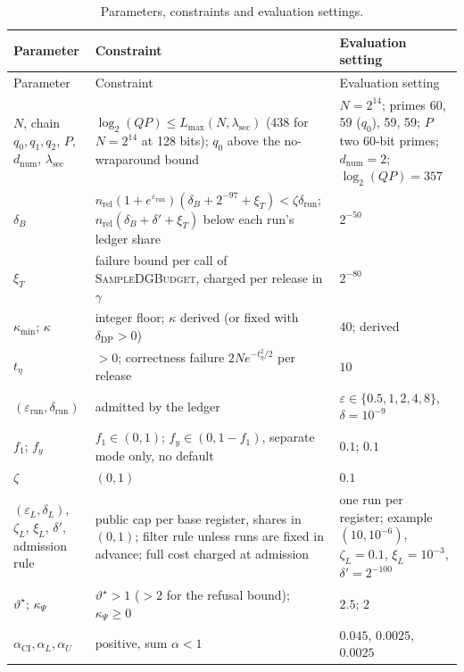 \documentclass[11pt]{article}
\theoremstyle{definition}
\theoremstyle{plain}
\begin{document}
{\small
\begin{longtable}{@{}>{\raggedright\arraybackslash}p{3.1cm}>{\raggedright\arraybackslash}p{7.6cm}>{\raggedright\arraybackslash}p{4.4cm}@{}}
\caption{Parameters, constraints and evaluation settings.}\label{tab:params}\\
\toprule
Parameter & Constraint & Evaluation setting \\
\midrule
\endfirsthead
\toprule
Parameter & Constraint & Evaluation setting \\
\midrule
\endhead
\bottomrule
\endlastfoot
$N$, chain $q_0,q_1,q_2$, $P$, $d_{\mathrm{num}}$, $\lambda_{\mathrm{sec}}$ & $\log_2(QP)\le L_{\max}(N,\lambda_{\mathrm{sec}})$ (438 for $N=2^{14}$ at 128 bits); $q_0$ above the no-wraparound bound & $N=2^{14}$; primes 60, 59 ($q_0$), 59, 59; $P$ two 60-bit primes; $d_{\mathrm{num}}=2$; $\log_2(QP)=357$ \\
$\delta_B$ & $n_{\mathrm{rel}}(1+e^{\varepsilon_{\mathrm{run}}})(\delta_B+2^{-97}+\xi_T)<\zeta\delta_{\mathrm{run}}$; $n_{\mathrm{rel}}(\delta_B+\delta'+\xi_T)$ below each run's ledger share & $2^{-50}$ \\
$\xi_T$ & failure bound per call of \textsc{SampleDGBudget}, charged per release in $\gamma$ & $2^{-80}$ \\
$\kappa_{\min}$; $\kappa$ & integer floor; $\kappa$ derived (or fixed with $\delta_{\mathrm{DP}}>0$) & $40$; derived \\
$t_\eta$ & $>0$; correctness failure $2Ne^{-t_\eta^2/2}$ per release & $10$ \\
$(\varepsilon_{\mathrm{run}},\delta_{\mathrm{run}})$ & admitted by the ledger & $\varepsilon\in\{0.5,1,2,4,8\}$, $\delta=10^{-9}$ \\
$f_1$; $f_y$ & $f_1\in(0,1)$; $f_y\in(0,1-f_1)$, separate mode only, no default & $0.1$; $0.1$ \\
$\zeta$ & $(0,1)$ & $0.1$ \\
$(\varepsilon_L,\delta_L)$, $\zeta_L$, $\xi_L$, $\delta'$, admission rule & public cap per base register, shares in $(0,1)$; filter rule unless runs are fixed in advance; full cost charged at admission & one run per register; example $(10,10^{-6})$, $\zeta_L=0.1$, $\xi_L=10^{-3}$, $\delta'=2^{-100}$ \\
$\vartheta^\star$; $\kappa_\Psi$ & $\vartheta^\star>1$ ($>2$ for the refusal bound); $\kappa_\Psi\ge0$ & $2.5$; $2$ \\
$\alpha_{\mathrm{CI}},\alpha_L,\alpha_U$ & positive, sum $\alpha<1$ & $0.045$, $0.0025$, $0.0025$ \\

\end{longtable}}
\end{document}
